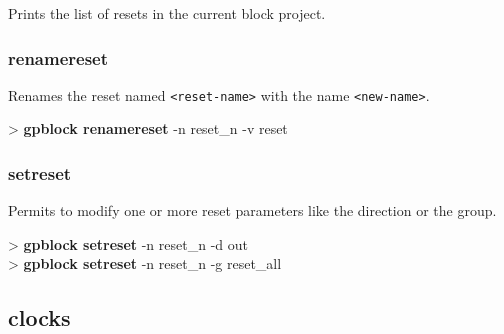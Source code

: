 \documentclass[10pt,a4paper]{article}
\begin{document}
Prints the list of resets in the current block project.

\subsubsection{renamereset}
\label{subsec:renamereset}

Renames the reset named \texttt{<reset-name>} with the name \texttt{<new-name>}.\\


\begin{sampletitle}
> \textbf{gpblock renamereset} -n reset\_n -v reset
\end{sampletitle}


\subsubsection{setreset}
\label{subsec:setreset}

Permits to modify one or more reset parameters like the direction or the group.\\


\begin{sampletitle}
> \textbf{gpblock setreset} -n reset\_n -d out \\
> \textbf{gpblock setreset} -n reset\_n -g reset\_all
\end{sampletitle}

\subsection{clocks}
\end{document}
